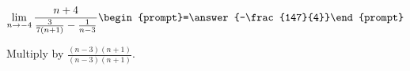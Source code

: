 \documentclass{ximera}
\author{Bart Snapp}
\begin{document}
\begin{exercise}

\[
\lim_{n\to -4 } \frac{n+4}{\frac{3}{7 (n+1)}-\frac{1}{n-3}}  \begin{prompt}=\answer{-\frac{147}{4}}\end{prompt}
\]
\begin{hint}
Multiply by $\frac{(n-3) (n+1)}{(n-3) (n+1)}$.
\end{hint}
\end{exercise}
\end{document}
